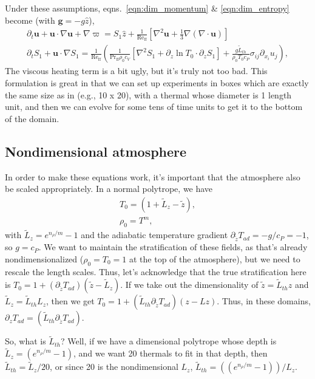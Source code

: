 \documentclass[onecolumn, amsmath, amsfonts, amssymb]{aastex62}
\newcommand{\DivU}{\ensuremath{\nabla\cdot\bm{u}}}
\newcommand{\grad}{\ensuremath{\nabla}}
\begin{document}
Under these assumptions, eqns.~\ref{eqn:dim_momentum} \& \ref{eqn:dim_entropy} become
(with $\bm{g} = - g \hat{z}$),
\begin{gather}
\partial_t \bm{u} + \bm{u}\cdot\grad\bm{u} + \grad \varpi = S_1\hat{z} 
+ \frac{1}{\text{Re}_{\text{ff}}}\left[\grad^2 \bm{u} + \frac{1}{3}\grad(\DivU)\right] \\
\partial_t S_1 + \bm{u}\cdot\grad S_1 = 
\frac{1}{\text{Re}_{\text{ff}}}\left(\frac{1}{\text{Pr}_{\text{ff}}\rho_0c_V }[\grad^2 S_1 + \partial_z\ln T_0 \cdot\partial_z S_1]
+ \frac{g \tilde{L}_{th}}{\rho_0 T_0 c_P}\sigma_{ij}\partial_{x_i}u_j \right),
\end{gather}
The viscous heating term is a bit ugly, but it's truly not too bad.
This formulation is great in that we can set up experiments in boxes
which are exactly the same size as in \citet{lecoanet&jeevanjee2018} (e.g., 10 x 20), with
a thermal whose diameter is 1 length unit, and then we can evolve for some tens of time units
to get it to the bottom of the domain.

\subsection{Nondimensional atmosphere}
In order to make these equations work, it's important that the atmosphere also be scaled 
appropriately. In a normal polytrope, we have
\begin{gather}
T_0= (1 + \tilde{L}_z - \tilde{z}), \\
\rho_0 = T^m,
\end{gather}
with $\tilde{L}_z = e^{n_\rho/m} - 1$ and the adiabatic temperature gradient
$\partial_{\tilde{z}} T_{ad} = -g/c_P = -1$, so $g = c_P$. We want to maintain the stratification
of these fields, as that's already nondimensionalized ($\rho_0 = T_0= 1$ at the top of the atmosphere),
but we need to rescale the length scales. Thus, let's acknowledge that the true stratification
here is $T_0= 1 + (\partial_{\tilde{z}} T_{ad})(\tilde{z} - \tilde{L}_z)$. If we take out the
dimensionality of $\tilde{z} = \tilde{L}_{th} z$ and $\tilde{L}_z = \tilde{L}_{th} L_z$, then
we get $T_0= 1 + (\tilde{L}_{th}\partial_{\tilde{z}} T_{ad})(z - Lz)$. Thus, in these domains,
$\partial_z T_{ad} = (\tilde{L}_{th}\partial_{\tilde{z}} T_{ad})$.

So, what is $\tilde{L}_{th}$? Well, if we have a dimensional polytrope whose depth is
$\tilde{L}_z = (e^{n_\rho/m} - 1)$, and we want 20 thermals to fit in that depth, then
$\tilde{L}_{th} = \tilde{L}_z / 20$, or since 20 is the nondimensional $L_z$, 
$\tilde{L}_{th} = ((e^{n_\rho/m} - 1))/L_z$.
\end{document}
